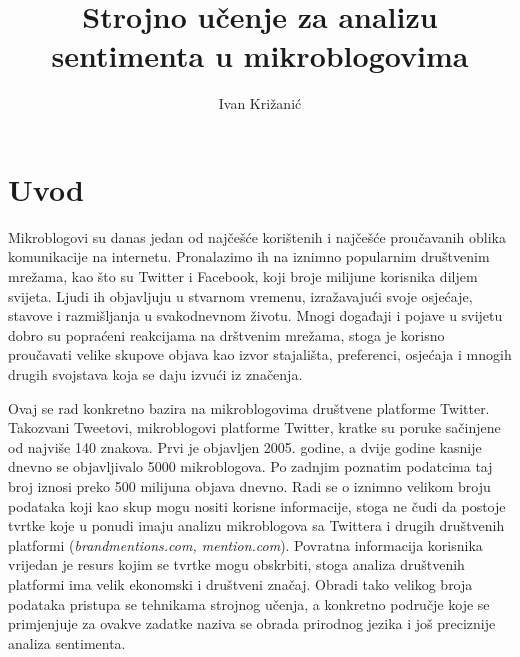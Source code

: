 \documentclass[times, utf8, zavrsni]{fer}
\begin{document}

\title{Strojno učenje za analizu sentimenta u mikroblogovima}

\author{Ivan Križanić}

\maketitle

\izvornik

\zahvala{}

\tableofcontents

\chapter{Uvod}

Mikroblogovi su danas jedan od najčešće korištenih i najčešće proučavanih oblika komunikacije na internetu. Pronalazimo ih na iznimno popularnim društvenim mrežama, kao što su Twitter i Facebook, koji broje milijune korisnika diljem svijeta. Ljudi ih objavljuju u stvarnom vremenu, izražavajući svoje osjećaje, stavove i razmišljanja u svakodnevnom životu. Mnogi događaji i pojave u svijetu dobro su popraćeni reakcijama na drštvenim mrežama, stoga je korisno proučavati velike skupove objava kao izvor stajališta, preferenci, osjećaja i mnogih drugih svojstava koja se daju izvući iz značenja. 

Ovaj se rad konkretno bazira na mikroblogovima društvene platforme Twitter. Takozvani Tweetovi, mikroblogovi platforme Twitter, kratke su poruke sačinjene od najviše 140 znakova. Prvi je objavljen 2005. godine, a dvije godine kasnije dnevno se objavljivalo 5000 mikroblogova. Po zadnjim poznatim podatcima taj broj iznosi preko 500 milijuna objava dnevno.\citep{twitterStats} Radi se o iznimno velikom broju podataka koji kao skup mogu nositi korisne informacije, stoga ne čudi da postoje tvrtke koje u ponudi imaju analizu mikroblogova sa Twittera i drugih društvenih platformi (\textit{brandmentions.com, mention.com}). Povratna informacija korisnika vrijedan je resurs kojim se tvrtke mogu obskrbiti, stoga analiza društvenih platformi ima velik ekonomski i društveni značaj. Obradi tako velikog broja podataka pristupa se tehnikama strojnog učenja, a konkretno područje koje se primjenjuje za ovakve zadatke naziva se obrada prirodnog jezika i još preciznije analiza sentimenta. 
\end{document}

